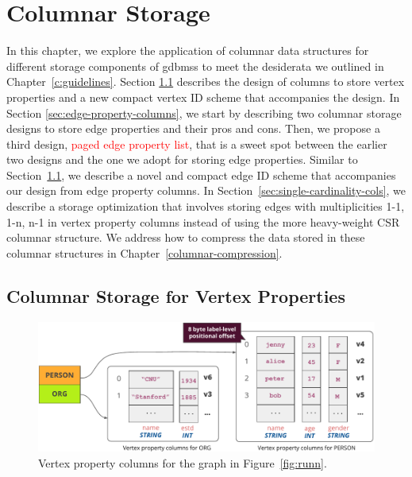 \chapter{Columnar Storage}
\label{c:columnar-storage}

In this chapter, we explore the application of columnar data structures for different storage components of  \gls{gdbms}s to meet the desiderata we outlined in Chapter~\ref{c:guidelines}. Section \ref{sec:vertex-property-columns} describes the design of columns to store vertex properties and a new compact vertex ID scheme that accompanies the design. In Section \ref{sec:edge-property-columns}, we start by describing two columnar storage designs to store edge properties and their pros and cons. Then, we propose a third design, \textcolor{red}{paged edge property list}, that is a sweet spot between the earlier two designs and the one we adopt for storing edge properties. Similar to Section~\ref{sec:vertex-property-columns}, we describe a novel and compact edge ID scheme that accompanies our design from edge property columns. In Section~\ref{sec:single-cardinality-cols}, we describe a storage optimization that involves storing edges with multiplicities 1-1, 1-n, n-1 in vertex property columns instead of using the more heavy-weight CSR columnar structure. We address how to compress the data stored in these columnar structures in Chapter~\ref{columnar-compression}.

\section{Columnar Storage for Vertex Properties}
\label{sec:vertex-property-columns}

\begin{figure}
	\hfill\includegraphics[scale=0.85]{img/vpcols}\hspace*{\fill}
	\caption{Vertex property columns for the graph in Figure~\ref{fig:runn}. }
	\label{fig:vpcols}
\end{figure}

